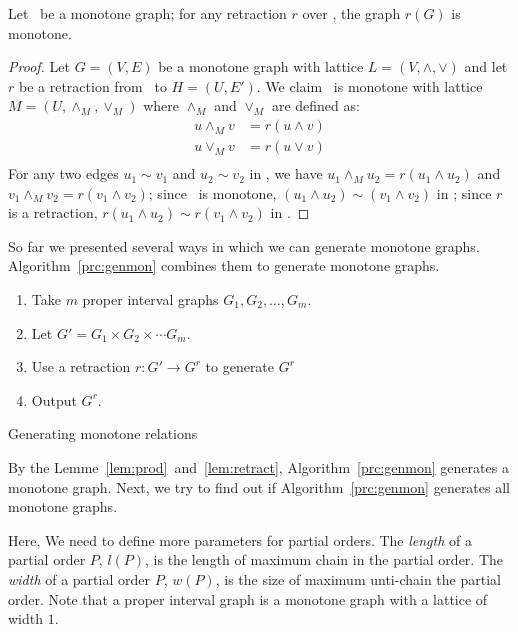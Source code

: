 \begin{lemma}
Let \mG\ be a monotone graph; for any retraction \(r\) over \mG, the graph
\(r(G)\) is monotone.
\end{lemma}

\begin{proof}
Let \(G=(V,E)\) be a monotone graph with lattice \(L=(V, \wedge,\vee)\) and
let \(r\) be a retraction from \mG\ to \(H=(U,E')\)\@. We claim
\mH\ is monotone with lattice \(M=(U,\wedge_M, \vee_M)\) where
\(\wedge_M\) and \(\vee_M\) are defined as:
\begin{eqnarray*}
u \wedge_M v &= r(u \wedge v) \\
u \vee_M v &= r(u \vee v) \\
\end{eqnarray*}
For any two edges \(u_1 \sim v_1\) and \(u_2 \sim v_2\) in \mH,
we have \(u_1 \wedge_M u_2 = r(u_1 \wedge u_2)\) and \(v_1 \wedge_M v_2 = r(v_1 \wedge v_2)\);
since \mG\ is monotone, \((u_1 \wedge u_2) \sim (v_1 \wedge v_2)\) in \mG;
since \(r\) is a retraction, \(r(u_1 \wedge u_2) \sim r(v_1 \wedge v_2)\) in \mH\@.
\end{proof}

So far we presented several ways in which we can generate monotone graphs.
Algorithm~\ref{prc:genmon} combines them to generate monotone graphs.
\begin{algorithm}
\begin{enumerate}
\item Take \(m\) proper interval graphs \(G_1,G_2,\dotsc,G_m\)\@.
\item Let \(G' = G_1 \times G_2 \times \dotsb G_m\)\@.
\item Use a retraction \(r:G' \to G^r\) to generate \(G^r\)
\item Output \(G^r\)\@.
\end{enumerate}
\caption{Generating monotone relations}\label{prc:genmon}
\end{algorithm}

By the Lemme~\ref{lem:prod}~and~\ref{lem:retract}, Algorithm~\ref{prc:genmon} generates a monotone graph.
Next, we try to find out if Algorithm~\ref{prc:genmon} generates all monotone graphs.

Here, We need to define more parameters for partial orders.
The \emph{length} of a partial order \(P\), \(l(P)\), is the length of maximum chain in
the partial order. The \emph{width} of a partial order \(P\),
\(w(P)\), is the size of maximum unti-chain the partial order.
Note that a proper interval graph is a monotone graph with a lattice of width \(1\)\@.

